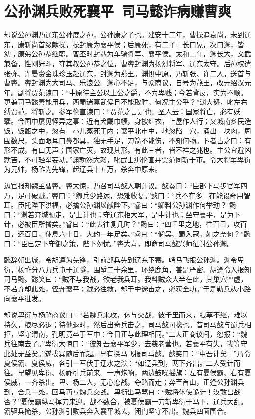 \chapter{公孙渊兵败死襄平~司马懿诈病赚曹爽}

却说公孙渊乃辽东公孙度之孙，公孙康之子也。建安十二年，曹操追袁尚，未到辽东，康斩尚首级献操，操封康为襄平侯；后康死，有二子：长曰晃，次曰渊，皆幼；康弟公孙恭继职。曹丕时封恭为车骑将军、襄平侯。太和二年，渊长大，文武兼备，性刚好斗，夺其叔公孙恭之位，曹睿封渊为扬烈将军、辽东太守。后孙权遣张弥、许晏赍金珠珍玉赴辽东，封渊为燕王。渊惧中原，乃斩张、许二人，送首与曹睿。睿封渊为大司马、乐浪公。渊心不足，与众商议，自号为燕王，改元绍汉元年。副将贾范谏曰：“中原待主公以上公之爵，不为卑贱；今若背反，实为不顺。更兼司马懿善能用兵，西蜀诸葛武侯且不能取胜，何况主公乎？”渊大怒，叱左右缚贾范，将斩之。参军伦直谏曰：“贾范之言是也。圣人云：国家将亡，必有妖孽。今国中屡见怪异之事：近有犬戴巾帻，身披红衣，上屋作人行；又城南乡民造饭，饭甑之中，忽有一小儿蒸死于内；襄平北市中，地忽陷一穴，涌出一块肉，周围数尺，头面眼耳口鼻都具，独无手足，刀箭不能伤，不知何物。卜者占之曰：有形不成，有口无声；国家亡灭，故现其形。有此三者，皆不祥之兆也。主公宜避凶就吉，不可轻举妄动。”渊勃然大怒，叱武士绑伦直并贾范同斩于市。令大将军卑衍为元帅，杨祚为先锋，起辽兵十五万，杀奔中原来。

边官报知魏主曹睿。睿大惊，乃召司马懿入朝计议。懿奏曰：“臣部下马步官军四万，足可破贼。”睿曰：“卿兵少路远，恐难收复。”懿曰：“兵不在多，在能设奇用智耳。臣托陛下洪福，必擒公孙渊以献陛下。”睿曰：“卿料公孙渊作何举动？”懿曰：“渊若弃城预走，是上计也；守辽东拒大军，是中计也；坐守襄平，是为下计，必被臣所擒矣。”睿曰：“此去往复几时？”懿曰：“四千里之地，往百日，攻百日，还百日，休息六十日，大约一年足矣。”睿曰：“倘吴、蜀入寇，如之奈何？”懿曰：“臣已定下守御之策，陛下勿忧。”睿大喜，即命司马懿兴师征讨公孙渊。

懿辞朝出城，令胡遵为先锋，引前部兵先到辽东下寨。哨马飞报公孙渊。渊令卑衍，杨祚分八万兵屯于辽隧，围堑二十余里，环绕鹿角，甚是严密。胡遵令人报知司马懿。懿笑曰：“贼不与我战，欲老我兵耳。我料贼众大半在此，其巢穴空虚，不若弃却此处，径奔襄平；贼必往救，却于中途击之，必获全功。”于是勒兵从小路向襄平进发。

却说卑衍与杨祚商议曰：“若魏兵来攻，休与交战。彼千里而来，粮草不继，难以持久，粮尽必退；待他退时，然后出奇兵击之，司马懿可擒也。昔司马懿与蜀兵相拒，坚守渭南，孔明竟卒于军中：今日正与此理相同。”二人正商议间，忽报：“魏兵往南去了。”卑衍大惊曰：“彼知吾襄平军少，去袭老营也。若襄平有失，我等守此处无益矣。”遂拔寨随后而起。早有探马飞报司马懿。懿笑曰：“中吾计矣！”乃令夏侯霸、夏侯威，各引一军伏于辽水之滨：“如辽兵到，两下齐出。”二人受计而往。早望见卑衍、杨祚引兵前来。一声炮响，两边鼓噪摇旗：左有夏侯霸、右有夏侯威，一齐杀出。卑、杨二人，无心恋战，夺路而走；奔至首山，正逢公孙渊兵到，合兵一处，回马再与魏兵交战。卑衍出马骂曰：“贼将休使诡计！汝敢出战否？”夏侯霸纵马挥刀来迎。战不数合，被夏侯霸一刀斩卑衍于马下，辽兵大乱。霸驱兵掩杀，公孙渊引败兵奔入襄平城去，闭门坚守不出。魏兵四面围合。

